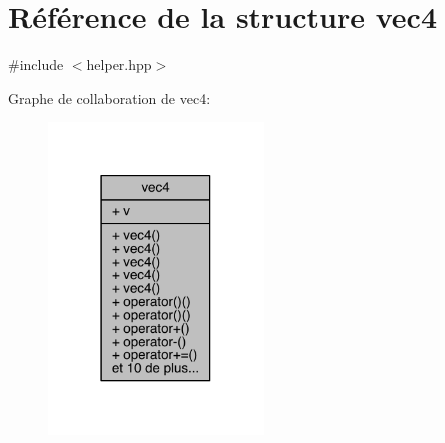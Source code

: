 \hypertarget{structvec4}{\section{Référence de la structure vec4}
\label{structvec4}
}


{\ttfamily \#include $<$helper.\+hpp$>$}



Graphe de collaboration de vec4\+:
\nopagebreak
\begin{figure}[H]
\begin{center}
\leavevmode
\includegraphics[width=162pt]{structvec4__coll__graph}
\end{center}
\end{figure}
